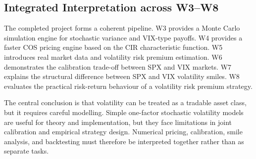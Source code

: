 \subsection{Integrated Interpretation across W3--W8}

The completed project forms a coherent pipeline. W3 provides a Monte Carlo simulation engine for stochastic variance and VIX-type payoffs. W4 provides a faster COS pricing engine based on the CIR characteristic function. W5 introduces real market data and volatility risk premium estimation. W6 demonstrates the calibration trade-off between SPX and VIX markets. W7 explains the structural difference between SPX and VIX volatility smiles. W8 evaluates the practical risk-return behaviour of a volatility risk premium strategy.

The central conclusion is that volatility can be treated as a tradable asset class, but it requires careful modelling. Simple one-factor stochastic volatility models are useful for theory and implementation, but they face limitations in joint calibration and empirical strategy design. Numerical pricing, calibration, smile analysis, and backtesting must therefore be interpreted together rather than as separate tasks.